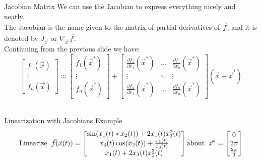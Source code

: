 \documentclass{beamer}
\begin{document}
	\begin{frame}{Jacobian Matrix}
	We can use the Jacobian to express everything nicely and neatly. \\
	The Jacobian is the name given to the matrix of partial derivatives of $\vec{f}$, and it is denoted by $J_{\vec{x}}$ or $\nabla_{\vec{x}}\vec{f}$. \\ \pause
	Continuing from the previous slide we have: \\
	\[
	\begin{bmatrix} f_1(\vec{x}) \\ \vdots \\f_n(\vec{x}) \end{bmatrix} \approx 
	\begin{bmatrix} f_1(\vec{x}^*) \\ \vdots \\f_n(\vec{x}^*) \end{bmatrix} + 
	\begin{bmatrix} \frac{\partial f_1}{\partial x_1}(\vec{x}^*)& \hdots& \frac{\partial f_1}{\partial x_n}(\vec{x}^*) \\ \vdots & \ddots &\vdots \\ \frac{\partial f_n}{\partial x_1}(\vec{x}^*)& \hdots &  \frac{\partial f_n}{\partial x_n}(\vec{x}^*) \end{bmatrix}
	(\vec{x} - \vec{x}^*)
	\]
	\\

	\end{frame}

	\begin{frame}{Linearization with Jacobians Example}
	    \begin{align*}
	    \text{Linearize}  \hspace{0.2 cm} 
	     \vec{f}(\vec{x}(t))  = 
	    \begin{bmatrix}
	    \sin(x_1(t)*x_2(t)) + 2x_1(t)x_3^2(t)\\
	    x_3(t)\cos(x_2(t)) + \frac{x_1(t)}{x_3(t)}\\
	    x_1(t) + 2x_3(t)x_2^3(t)
	    \end{bmatrix} 
	    \text{about} \hspace{0.2 cm} \vec{x}^* = \begin{bmatrix}
	    0\\ 2 \pi \\ \frac{2 \pi}{3}
	    \end{bmatrix} 
	    \end{align*}
	\end{frame}
\end{document}
